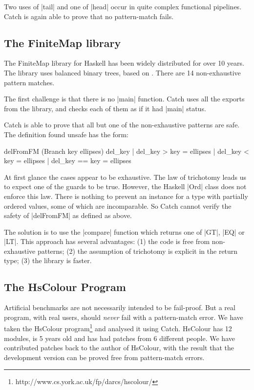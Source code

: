 \documentclass[preprint]{sigplanconf}
\begin{document}
\noindent Two uses of |tail| and one of |head| occur in quite complex functional pipelines. Catch is again able to prove that no pattern-match fails.

\subsection{The FiniteMap library}
\label{sec:finitemap}

The FiniteMap library for Haskell has been widely distributed for over 10 years. The library uses balanced binary trees, based on \cite{adams:sets}. There are 14 non-exhaustive pattern matches.

The first challenge is that there is no |main| function. Catch uses all the exports from the library, and checks each of them as if it had |main| status.

Catch is able to prove that all but one of the non-exhaustive patterns are safe. The definition found unsafe has the form:

\begin{code}
delFromFM (Branch key ellipses) del_key  | del_key  >   key = ellipses
                                         | del_key  <   key = ellipses
                                         | del_key  ==  key = ellipses
\end{code}

At first glance the cases appear to be exhaustive. The law of trichotomy leads us to expect one of the guards to be true. However, the Haskell |Ord| class does not enforce this law. There is nothing to prevent an instance for a type with partially ordered values, some of which are incomparable. So Catch cannot verify the safety of |delFromFM| as defined as above.

The solution is to use the |compare| function which returns one of |GT|, |EQ| or |LT|. This approach has several advantages: (1) the code is free from non-exhaustive patterns; (2) the assumption of trichotomy is explicit in the return type; (3) the library is faster.


\subsection{The HsColour Program}
\label{sec:hscolour}

Artificial benchmarks are not necessarily intended to be fail-proof. But a real program, with real users, should \textit{never} fail with a pattern-match error. We have taken the HsColour program\footnote{http://www.cs.york.ac.uk/fp/darcs/hscolour/} and analysed it using Catch. HsColour has 12 modules, is 5 years old and has had patches from 6 different people.
We have contributed patches back to the author of HsColour, with the result that the development version can be proved free from pattern-match errors.
\end{document}
